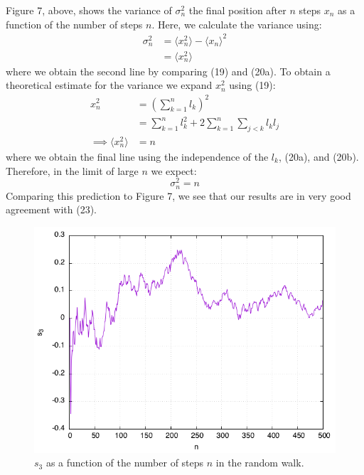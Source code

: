\documentclass[12pt,letterpaper]{article}
\begin{document}
Figure 7, above, shows the variance of $\sigma_{n}^2$ the final position after $n$ steps $x_n$ as a function of the number of steps $n$. Here, we calculate the variance using:
\begin{align}
	\sigma_n^2 &= \langle x_n^2 \rangle - \langle x_n \rangle^2 \nonumber \\
			   &= \langle x_n^2 \rangle
\end{align}
where we obtain the second line by comparing (19) and (20a). To obtain a theoretical estimate for the variance we expand $x_n^2$ using (19):
\begin{align}
	x_n^2 &= \left(\sum\limits_{k=1}^{n} l_k \right)^2 \nonumber \\
		  &= \sum\limits_{k=1}^{n} l_k^2 + 2\sum\limits_{k=1}^{n}\sum\limits_{j<k} l_k l_j \nonumber \\
	\implies \langle x_n^2 \rangle &= n
\end{align}
where we obtain the final line using the independence of the $l_k$, (20a), and (20b). Therefore, in the limit of large $n$ we expect:
\begin{equation}
	\sigma_n^2 = n
\end{equation}
Comparing this prediction to Figure 7, we see that our results are in very good agreement with (23). 

\begin{figure}[H]
	\centering
	\includegraphics[scale=0.6]{s_3.png}
	\caption{$s_3$ as a function of the number of steps $n$ in the random walk.}
\end{figure}
\end{document}
